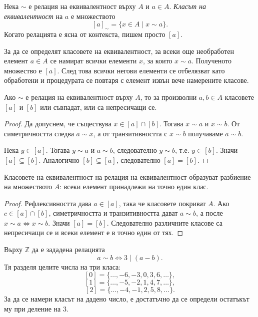 \begin{defn}
Нека $\sim$ е релация на еквивалентност върху $A$ и $a\in A$. \emph{Класът на еквивалентност} на $a$ е множеството
\[
[a]_{\sim}=\{x\in A\mid x\sim a\}.
\]
Когато релацията е ясна от контекста, пишем просто $[a]$.
\end{defn}

За да се определят класовете на еквивалентност, за всеки още необработен елемент $a\in A$ се намират всички елементи $x$, за които $x\sim a$. Полученото множество е $[a]$. След това всички негови елементи се отбелязват като обработени и процедурата се повтаря с елемент извън вече намерените класове.

\begin{prop}
Ако $\sim$ е релация на еквивалентност върху $A$, то за произволни $a,b\in A$ класовете $[a]$ и $[b]$ или съвпадат, или са непресичащи се.
\end{prop}

\begin{proof}
Да допуснем, че съществува $x\in [a]\cap[b]$. Тогава $x\sim a$ и $x\sim b$. От симетричността следва $a\sim x$, а от транзитивността с $x\sim b$ получаваме $a\sim b$.

Нека $y\in[a]$. Тогава $y\sim a$ и $a\sim b$, следователно $y\sim b$, т.е. $y\in[b]$. Значи $[a]\subseteq[b]$. Аналогично $[b]\subseteq[a]$, следователно $[a]=[b]$.
\end{proof}

\begin{cor}
Класовете на еквивалентност на релация на еквивалентност образуват разбиение на множеството $A$: всеки елемент принадлежи на точно един клас.
\end{cor}

\begin{proof}
Рефлексивността дава $a\in[a]$, така че класовете покриват $A$. Ако $c\in[a]\cap[b]$, симетричността и транзитивността дават $a\sim b$, а после $x\sim a\Longleftrightarrow x\sim b$. Значи $[a]=[b]$. Следователно различните класове са непресичащи се и всеки елемент е в точно един от тях.
\end{proof}

\begin{example}
Върху $\mathbb{Z}$ да е зададена релацията
\[
a\sim b\Longleftrightarrow 3\mid(a-b).
\]
Тя разделя целите числа на три класа:
\[
[0]=\{\ldots,-6,-3,0,3,6,\ldots\},
\]
\[
[1]=\{\ldots,-5,-2,1,4,7,\ldots\},
\]
\[
[2]=\{\ldots,-4,-1,2,5,8,\ldots\}.
\]
За да се намери класът на дадено число, е достатъчно да се определи остатъкът му при деление на $3$.
\end{example}

